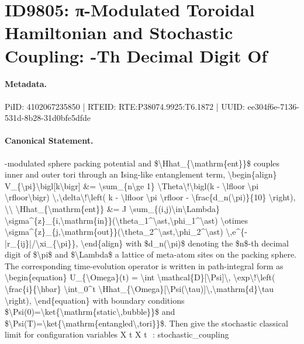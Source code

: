 \section*{ID9805: π-Modulated Toroidal Hamiltonian and Stochastic Coupling: -Th Decimal Digit Of}
\paragraph{Metadata.}
PiID: 4102067235850 | RTEID: RTE:P38074.9925:T6.1872 | UUID: ee304f6e-7136-531d-8b28-31d0bfe5dfde

\paragraph{Canonical Statement.}
-modulated sphere packing potential and \$\textbackslash{}Hhat\_\{\textbackslash{}mathrm\{ent\}\}\$ couples inner and outer tori through an Ising-like entanglement term, \textbackslash{}begin\{align\} V\_\{\textbackslash{}pi\}\textbackslash{}bigl[k\textbackslash{}bigr] \&= \textbackslash{}sum\_\{n\textbackslash{}ge 1\} \textbackslash{}Theta\textbackslash{}!\textbackslash{}bigl(k - \textbackslash{}lfloor \textbackslash{}pi \textbackslash{}rfloor\textbackslash{}bigr) \textbackslash{},\textbackslash{}delta\textbackslash{}!\textbackslash{}left( k - \textbackslash{}lfloor \textbackslash{}pi \textbackslash{}rfloor - \textbackslash{}frac\{d\_n(\textbackslash{}pi)\}\{10\} \textbackslash{}right), \textbackslash{}\textbackslash{} \textbackslash{}Hhat\_\{\textbackslash{}mathrm\{ent\}\} \&= J \textbackslash{}sum\_\{(i,j)\textbackslash{}in\textbackslash{}Lambda\} \textbackslash{}sigma\textasciicircum{}\{z\}\_\{i,\textbackslash{}mathrm\{in\}\}(\textbackslash{}theta\_1\textasciicircum{}\textbackslash{}ast,\textbackslash{}phi\_1\textasciicircum{}\textbackslash{}ast) \textbackslash{}otimes \textbackslash{}sigma\textasciicircum{}\{z\}\_\{j,\textbackslash{}mathrm\{out\}\}(\textbackslash{}theta\_2\textasciicircum{}\textbackslash{}ast,\textbackslash{}phi\_2\textasciicircum{}\textbackslash{}ast) \textbackslash{},e\textasciicircum{}\{-|r\_\{ij\}|/\textbackslash{}xi\_\{\textbackslash{}pi\}\}, \textbackslash{}end\{align\} with \$d\_n(\textbackslash{}pi)\$ denoting the \$n\$-th decimal digit of \$\textbackslash{}pi\$ and \$\textbackslash{}Lambda\$ a lattice of meta-atom sites on the packing sphere. The corresponding time-evolution operator is written in path-integral form as \textbackslash{}begin\{equation\} U\_\{\textbackslash{}Omega\}(t) = \textbackslash{}int \textbackslash{}mathcal\{D\}[\textbackslash{}Psi]\textbackslash{}, \textbackslash{}exp\textbackslash{}!\textbackslash{}left( \textbackslash{}frac\{i\}\{\textbackslash{}hbar\} \textbackslash{}int\_0\textasciicircum{}t \textbackslash{}Hhat\_\{\textbackslash{}Omega\}[\textbackslash{}Psi(\textbackslash{}tau)]\textbackslash{},\textbackslash{}mathrm\{d\}\textbackslash{}tau \textbackslash{}right), \textbackslash{}end\{equation\} with boundary conditions \$\textbackslash{}Psi(0)=\textbackslash{}ket\{\textbackslash{}mathrm\{static\textbackslash{},bubble\}\}\$ and \$\textbackslash{}Psi(T)=\textbackslash{}ket\{\textbackslash{}mathrm\{entangled\textbackslash{},tori\}\}\$. Then give the stochastic classical limit for configuration variables X t X t ​ : stochastic\_coupling


